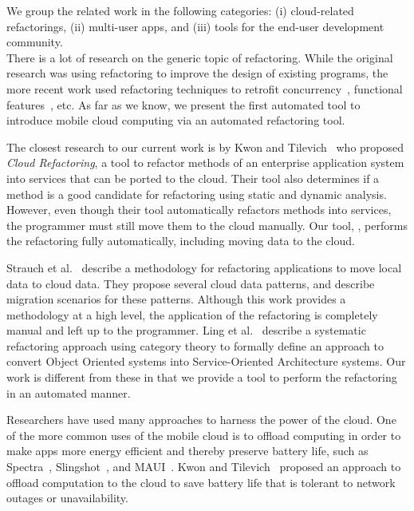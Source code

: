\documentclass[article]{sigplanconf}
\begin{document}
We group the related work in the following categories: (i) cloud-related refactorings, (ii) multi-user apps, and (iii) tools for the end-user development community. \\

There is a lot of research on the generic topic of refactoring. While the original research was using refactoring to improve the design of existing programs, the more recent work used refactoring techniques to retrofit 
concurrency~\cite{wloka2009refactoring,dig2009refactoring}, functional features~\cite{Gyori:Lambdaficator}, etc.
As far as we know, we present the first automated tool to introduce mobile cloud computing via an automated refactoring tool.

The closest research to our current work is by Kwon and Tilevich~\cite{kwon2013cloud} who proposed \emph{Cloud Refactoring}, a tool to refactor methods of an enterprise application system into services that can be  ported to the cloud. Their tool also determines if a method is a good candidate for refactoring using static and dynamic analysis. However, even though their tool automatically refactors methods into services, the programmer must still move them to the cloud manually.  
Our tool, \tool, performs the refactoring fully automatically, including moving data to the cloud.  

Strauch et al.~\cite{strauchmigrating} describe a methodology for refactoring applications to move local data to cloud data. They propose several cloud data patterns, and describe migration scenarios for these patterns. Although this work provides a methodology at a high level, the application of the refactoring is completely manual and left up to the programmer. 
Ling et al.~\cite{ling2010refactoring} describe a systematic refactoring approach 
using category theory to formally define an approach to convert Object Oriented systems 
into Service-Oriented Architecture systems. 
Our work is different from these in that we provide a tool to perform the refactoring in an automated manner.

Researchers have used many approaches to harness the power of the cloud.
One of the more common uses of the mobile cloud is to offload computing in order to make apps more energy efficient and thereby preserve battery life, such as Spectra~\cite{flinn2002balancing}, Slingshot~\cite{su2005slingshot}, and MAUI~\cite{cuervo2010maui}.  
Kwon and Tilevich~\cite{kwon2012energy} proposed an approach to offload computation to the cloud to save battery life that is tolerant to network outages or unavailability.
\end{document}
